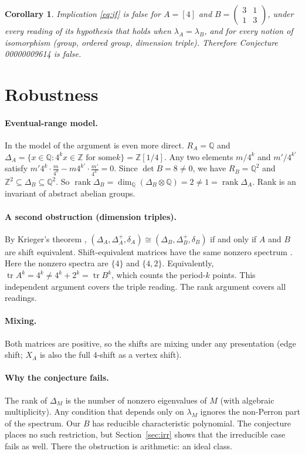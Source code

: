 \documentclass[11pt]{article}
\newtheorem{corollary}[theorem]{Corollary}
\theoremstyle{definition}
\theoremstyle{remark}
\newcommand{\Z}{\mathbb{Z}}
\newcommand{\Q}{\mathbb{Q}}
\begin{document}
\begin{corollary}
Implication \eqref{eq:if} is false for $A=[4]$ and
$B=\left(\begin{smallmatrix}3&1\\1&3\end{smallmatrix}\right)$, under every reading of
its hypothesis that holds when $\lambda_A=\lambda_B$, and for every notion of
isomorphism (group, ordered group, dimension triple). Therefore Conjecture
00000009614 is false.
\end{corollary}

\section{Robustness}\label{sec:er}
\paragraph{Eventual-range model.} In the model of \cite[\S7.5]{lm} the argument is
even more direct. $R_A=\Q$ and $\Delta_A=\{x\in\Q:4^kx\in\Z\text{ for some
}k\}=\Z[1/4]$. Any two elements $m/4^k$ and $m'/4^{k'}$ satisfy
$m'4^k\cdot\frac{m}{4^k}-m4^{k'}\cdot\frac{m'}{4^{k'}}=0$. Since $\det B=8\ne0$, we
have $R_B=\Q^2$ and $\Z^2\subseteq\Delta_B\subseteq\Q^2$. So
$\operatorname{rank}\Delta_B=\dim_\Q(\Delta_B\otimes\Q)=2\neq1=\operatorname{rank}\Delta_A$.
Rank is an invariant of abstract abelian groups.

\paragraph{A second obstruction (dimension triples).} By Krieger's theorem
\cite[\S7.5]{lm}, $(\Delta_A,\Delta_A^+,\delta_A)\cong(\Delta_B,\Delta_B^+,\delta_B)$
if and only if $A$ and $B$ are shift equivalent. Shift-equivalent matrices have the
same nonzero spectrum \cite[\S7.4]{lm}. Here the nonzero spectra are $\{4\}$ and
$\{4,2\}$. Equivalently, $\operatorname{tr}A^k=4^k\neq4^k+2^k=\operatorname{tr}B^k$,
which counts the period-$k$ points. This independent argument covers the triple
reading. The rank argument covers all readings.

\paragraph{Mixing.} Both matrices are positive, so the shifts are mixing under any
presentation (edge shift; $X_A$ is also the full $4$-shift as a vertex shift).

\paragraph{Why the conjecture fails.} The rank of $\Delta_M$ is the number of nonzero
eigenvalues of $M$ (with algebraic multiplicity). Any condition that depends only
on $\lambda_M$ ignores the non-Perron part of the spectrum. Our $B$ has reducible
characteristic polynomial. The conjecture places no such restriction, but
Section~\ref{sec:irr} shows that the irreducible case fails as well. There the
obstruction is arithmetic: an ideal class.
\end{document}
